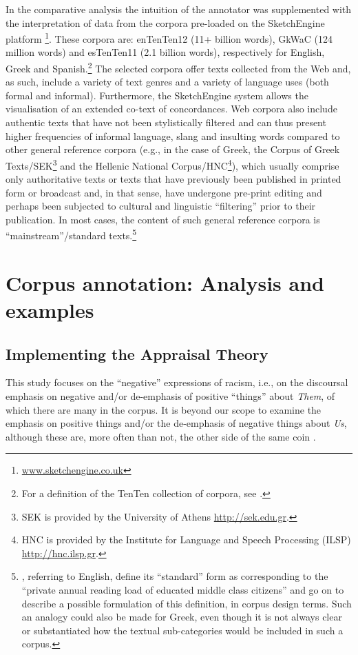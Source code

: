 \documentclass[output=paper]{LSP/langsci}
\begin{document}
In the comparative analysis the intuition of the annotator was supplemented with the interpretation of data from the corpora pre-loaded on the SketchEngine platform \citep{Kilgarriff2004}\footnote{\url{www.sketchengine.co.uk}}. These corpora are: enTenTen12 (11+ billion words), GkWaC (124 million words) and esTenTen11 (2.1 billion words), respectively for English, Greek and Spanish.\footnote{For a definition of the TenTen collection of corpora, see \citet{ Jakubicek2013}.} The selected corpora offer texts collected from the Web and, as such, include a variety of text genres and a variety of language uses (both formal and informal). Furthermore, the SketchEngine system allows the visualisation of an extended co-text of concordances. Web corpora also include authentic texts that have not been stylistically filtered and can thus present higher frequencies of informal language, slang and insulting words compared to other general reference corpora (e.g., in the case of Greek, the Corpus of Greek Texts/SEK\footnote{SEK is provided by the University of Athens \url{http://sek.edu.gr}.} and the Hellenic National Corpus/HNC\footnote{HNC is provided by the Institute for Language and Speech Processing (ILSP) \url{http://hnc.ilsp.gr}.}), which usually comprise only authoritative texts or texts that have previously been published in printed form or broadcast and, in that sense, have undergone pre-print editing and perhaps been subjected to cultural and linguistic “filtering” prior to their publication. In most cases, the content of such general reference corpora is “mainstream”/standard texts.\footnote{\citet[65--66]{Teubert2007}, referring to English, define its “standard” form as corresponding to the “private annual reading load of educated middle class citizens” and go on to describe a possible formulation of this definition, in corpus design terms. Such an analogy could also be made for Greek, even though it is not always clear or substantiated how the textual sub-categories would be included in such a corpus.}

\section{Corpus annotation: Analysis and examples} \label{sec:2:4} 
\subsection{Implementing the Appraisal Theory} \label{sec:2:4:1}

This study focuses on the “negative” expressions of racism, i.e., on the discoursal emphasis on negative and/or de-emphasis of positive “things” about \textit{Them}, of which there are many in the corpus. It is beyond our scope to examine the emphasis on positive things and/or the de-emphasis of negative things about \textit{Us}, although these are, more often than not, the other side of the same coin \citep[44]{Dijk2000b}.
\end{document}
